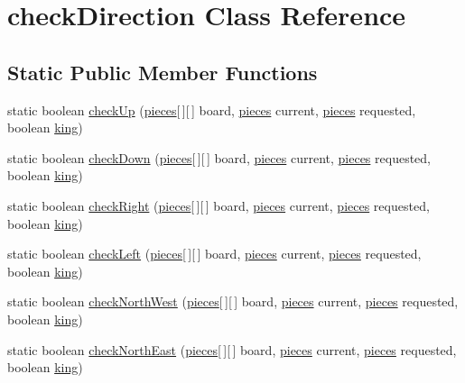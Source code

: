 \hypertarget{classcheckDirection}{\section{check\-Direction Class Reference}
\label{classcheckDirection}
}
\subsection*{Static Public Member Functions}
\begin{DoxyCompactItemize}
\item 
static boolean \hyperlink{classcheckDirection_ae08c8105c6b5942f70ca0e1ef5f1e0c4}{check\-Up} (\hyperlink{classpieces}{pieces}\mbox{[}$\,$\mbox{]}\mbox{[}$\,$\mbox{]} board, \hyperlink{classpieces}{pieces} current, \hyperlink{classpieces}{pieces} requested, boolean \hyperlink{classking}{king})
\item 
static boolean \hyperlink{classcheckDirection_ad7229f4047580e07b0115944773c63e1}{check\-Down} (\hyperlink{classpieces}{pieces}\mbox{[}$\,$\mbox{]}\mbox{[}$\,$\mbox{]} board, \hyperlink{classpieces}{pieces} current, \hyperlink{classpieces}{pieces} requested, boolean \hyperlink{classking}{king})
\item 
static boolean \hyperlink{classcheckDirection_a3d506313ab3d4bafab7cda3428e6f5b3}{check\-Right} (\hyperlink{classpieces}{pieces}\mbox{[}$\,$\mbox{]}\mbox{[}$\,$\mbox{]} board, \hyperlink{classpieces}{pieces} current, \hyperlink{classpieces}{pieces} requested, boolean \hyperlink{classking}{king})
\item 
static boolean \hyperlink{classcheckDirection_aa23f25e9d01448e4715df922459f562e}{check\-Left} (\hyperlink{classpieces}{pieces}\mbox{[}$\,$\mbox{]}\mbox{[}$\,$\mbox{]} board, \hyperlink{classpieces}{pieces} current, \hyperlink{classpieces}{pieces} requested, boolean \hyperlink{classking}{king})
\item 
static boolean \hyperlink{classcheckDirection_a3f9399e158002f1c2d9b9cfc0a9a9082}{check\-North\-West} (\hyperlink{classpieces}{pieces}\mbox{[}$\,$\mbox{]}\mbox{[}$\,$\mbox{]} board, \hyperlink{classpieces}{pieces} current, \hyperlink{classpieces}{pieces} requested, boolean \hyperlink{classking}{king})
\item 
static boolean \hyperlink{classcheckDirection_a4252e99d950a0601ab2ca8bda400be4a}{check\-North\-East} (\hyperlink{classpieces}{pieces}\mbox{[}$\,$\mbox{]}\mbox{[}$\,$\mbox{]} board, \hyperlink{classpieces}{pieces} current, \hyperlink{classpieces}{pieces} requested, boolean \hyperlink{classking}{king})

\end{DoxyCompactItemize}
